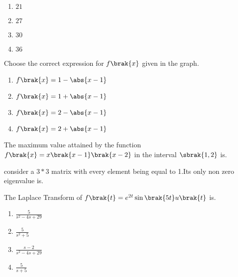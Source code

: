  \begin{enumerate}
    \item$21$\\
    \item$27$\\
    \item$30$\\
    \item$36$
    \end{enumerate}
    \item Choose the correct expression for $f\brak{x}$ given in the graph.
    \begin{enumerate}
        \item $f\brak{x}=1-\abs{x-1}$\\
        \item $f\brak{x}=1+\abs{x-1}$\\
        \item $f\brak{x}=2-\abs{x-1}$\\
        \item $f\brak{x}=2+\abs{x-1}$
    \end{enumerate}
    \item The maximum value attained by the function $f\brak{x}=x\brak{x-1}\brak{x-2}$ in the interval $\sbrak{1,2}$ is.\\
    \item consider a $3 * 3$ matrix with every element being equal to 1.Its only non zero eigenvalue is.
    \item The Laplace Transform of $f\brak{t}=e^{2t}\sin\brak{5t}u\brak{t}$ is.
    \begin{enumerate}
        \item$\frac{5}{s^{2}-4s+29}$\\
        \item$\frac{5}{s^{2}+5}$\\
        \item$\frac{s-2}{s^{2}-4s+29}$\\
        \item$\frac{5}{s+5}$
    \end{enumerate}

    

